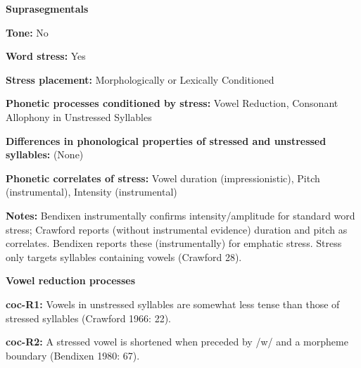 \begin{styleBody}
\textbf{Suprasegmentals}
\end{styleBody}

\begin{styleBody}
\textbf{Tone: }No
\end{styleBody}

\begin{styleBody}
\textbf{Word stress:} Yes
\end{styleBody}

\begin{styleBody}
\textbf{Stress placement:} Morphologically or Lexically Conditioned
\end{styleBody}

\begin{styleBody}
\textbf{Phonetic processes conditioned by stress:} Vowel Reduction, Consonant Allophony in Unstressed Syllables
\end{styleBody}

\begin{styleBody}
\textbf{Differences in phonological properties of stressed and unstressed syllables:} (None)
\end{styleBody}

\begin{styleBody}
\textbf{Phonetic correlates of stress: }Vowel duration (impressionistic), Pitch (instrumental), Intensity (instrumental)
\end{styleBody}

\begin{styleBody}
\textbf{Notes:} Bendixen instrumentally confirms intensity/amplitude for standard word stress; Crawford reports (without instrumental evidence) duration and pitch as correlates. Bendixen reports these (instrumentally) for emphatic stress. Stress only targets syllables containing vowels (Crawford 28).
\end{styleBody}

\begin{styleBody}
\textbf{Vowel reduction processes}
\end{styleBody}

\begin{styleBody}
\textbf{coc-R1:} Vowels in unstressed syllables are somewhat less tense than those of stressed syllables (Crawford 1966: 22).
\end{styleBody}

\begin{styleBody}
\textbf{coc-R2:} A stressed vowel is shortened when preceded by /w/ and a morpheme boundary (Bendixen 1980: 67).
\end{styleBody}


